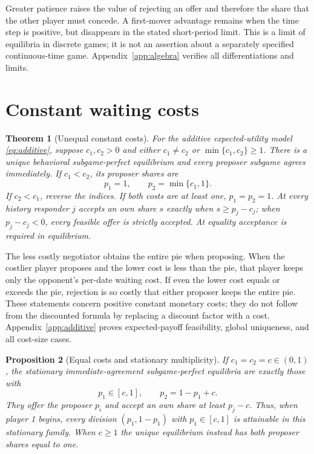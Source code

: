 \documentclass[11pt]{article}
\newtheorem{theorem}{Theorem}
\newtheorem{proposition}[theorem]{Proposition}
\begin{document}
Greater patience raises the value of rejecting an offer and therefore the share that the other player must concede. A first-mover advantage remains when the time step is positive, but disappears in the stated short-period limit. This is a limit of equilibria in discrete games; it is not an assertion about a separately specified continuous-time game. Appendix~\ref{app:algebra} verifies all differentiations and limits.

\section{Constant waiting costs}\label{sec:additive}
\begin{theorem}[Unequal constant costs]\label{th:additive}
For the additive expected-utility model \eqref{eq:additive}, suppose $c_1,c_2>0$ and either $c_1\ne c_2$ or $\min\{c_1,c_2\}\ge1$. There is a unique behavioral subgame-perfect equilibrium and every proposer subgame agrees immediately. If $c_1<c_2$, its proposer shares are
\begin{equation}\label{eq:addformula}
 p_1=1,\qquad p_2=\min\{c_1,1\}.
\end{equation}
If $c_2<c_1$, reverse the indices. If both costs are at least one, $p_1=p_2=1$. At every history responder $j$ accepts an own share $s$ exactly when $s\ge p_j-c_j$; when $p_j-c_j<0$, every feasible offer is strictly accepted. At equality acceptance is required in equilibrium.
\end{theorem}

The less costly negotiator obtains the entire pie when proposing. When the costlier player proposes and the lower cost is less than the pie, that player keeps only the opponent's per-date waiting cost. If even the lower cost equals or exceeds the pie, rejection is so costly that either proposer keeps the entire pie. These statements concern positive constant monetary costs; they do not follow from the discounted formula by replacing a discount factor with a cost. Appendix~\ref{app:additive} proves expected-payoff feasibility, global uniqueness, and all cost-size cases.

\begin{proposition}[Equal costs and stationary multiplicity]\label{prop:equal}
If $c_1=c_2=c\in(0,1)$, the stationary immediate-agreement subgame-perfect equilibria are exactly those with
\begin{equation}\label{eq:equal}
 p_1\in[c,1],\qquad p_2=1-p_1+c.
\end{equation}
They offer the proposer $p_i$ and accept an own share at least $p_j-c$. Thus, when player 1 begins, every division $(p_1,1-p_1)$ with $p_1\in[c,1]$ is attainable in this stationary family. When $c\ge1$ the unique equilibrium instead has both proposer shares equal to one.
\end{proposition}
\end{document}
